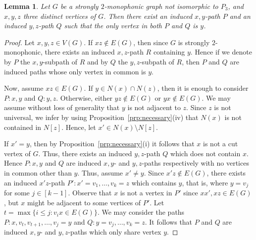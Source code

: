 \documentclass[a4paper,11pt]{article}
\newtheorem{lemma}[theorem]{Lemma}
\begin{document}
\begin{lemma}\label{l:disjointpaths}
    Let $G$ be a strongly $2$-monophonic graph not isomorphic to $P_3$, and $x,y,z$ three distinct vertices of $G$. Then there exist an induced $x,y$-path $P$ and an induced $y,z$-path $Q$ such that the only vertex in both $P$ and $Q$ is $y$. 
\end{lemma}
\begin{proof}
    Let $x,y,z\in V(G)$. If $xz\notin E(G)$, then since $G$ is strongly $2$-monophonic, there exists an induced $x,z$-path $R$ containing $y$. Hence if we denote by $P$ the $x,y$-subpath of $R$ and by $Q$ the $y,z$-subpath of $R$, then  $P$ and $Q$ are induced paths whose only vertex in common is $y$.
    
    Now, assume $xz\in E(G)$. If $y\in N(x)\cap N(z)$, then it is enough to consider $P:x,y$ and $Q:y,z$. 
    Otherwise, either $yz\notin E(G)$ or $yx\notin E(G)$. 
    We may assume without loss of generality that $y$ is not adjacent to $z$. Since $z$ is not universal, we infer by using Proposition~\ref{prp:necessary}(iv) that $N(x)$ is not contained in $N[z]$. Hence, let $x'\in N(x)\setminus N[z]$. 

    If $x'=y$, then by Proposition~\ref{prp:necessary}(i) it follows that $x$ is not a cut vertex of $G$. Thus, there exists an induced $y,z$-path $Q$ which does not contain $x$. Hence $P:x,y$ and $Q$ are induced $x,y$- and $y,z$-paths respectively with no vertices in common other than $y$. Thus, assume $x'\neq y$. Since $x'z\notin E(G)$, there exists an induced $x'z$-path $P':x'=v_1,\ldots,v_k=z$ which contains $y$, that is, where $y=v_j$ for some $j\in [k-1]$. 
    Observe that $x$ is not a vertex in $P'$ since $xx',xz\in E(G)$, but $x$ might be adjacent to some vertices of $P'$. Let $t=\max\{i\leq j:v_ix\in E(G)\}$.
    We may consider the paths $P:x,v_t,v_{t+1},\ldots,v_j=y$ and $Q:y=v_j,\ldots, v_k=z$. 
    It follows that $P$ and $Q$ are induced $x,y$- and $y,z$-paths which only share vertex $y$.
\end{proof}


\iffalse
\end{document}
